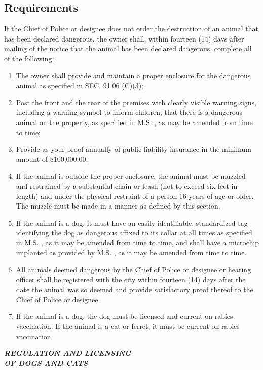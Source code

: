 \subsection{Requirements}
If the Chief of Police or designee does not order the destruction of an animal that has been declared dangerous, the owner shall, within fourteen (14) days after mailing of the notice that the animal has been declared dangerous, complete all of the following:
\begin{enumerate}[{\indent}1)]
\item The owner shall provide and maintain a proper enclosure for the dangerous animal as specified in SEC. 91.06 (C)(3);
\item Post the front and the rear of the premises with clearly visible warning signs, including a warning symbol to inform children, that there is a dangerous animal on the property, as specified in M.S. , as may be amended from time to time;
\item Provide as your proof annually of public liability insurance in the minimum amount of \$100,000.00;
\item If the animal is outside the proper enclosure, the animal must be muzzled and restrained by a substantial chain or leash (not to exceed six feet in length) and under the physical restraint of a person 16 years of age or older.  The muzzle must be made in a manner as defined by this section.
\item If the animal is a dog, it must have an easily identifiable, standardized tag identifying the dog as dangerous affixed to its collar at all times as specified in M.S. , as it may be amended from time to time, and shall have a microchip implanted as provided by M.S. , as it may be amended from time to time.
\item All animals deemed dangerous by the Chief of Police or designee or hearing officer shall be registered with the city within fourteen (14) days after the date the animal was so deemed and provide satisfactory proof thereof to the Chief of Police or designee.
\item If the animal is a dog, the dog must be licensed and current on rabies vaccination.  If the animal is a cat or ferret, it must be current on rabies vaccination.
\end{enumerate}

\begin{center}
\emph{\textbf{\LARGE{REGULATION AND LICENSING \\OF DOGS AND CATS}}}
\end{center}


